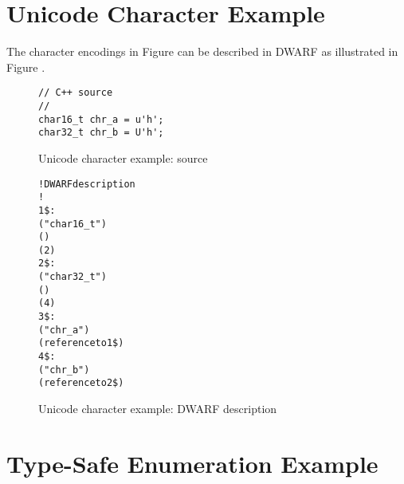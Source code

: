 \section{Unicode Character Example}
\label{app:unicodecharacterexample}
The  character encodings in
Figure 
can be described in DWARF as illustrated in 
Figure .

\begin{figure}[!h]
\begin{lstlisting}[numbers=none]
// C++ source
//
char16_t chr_a = u'h';
char32_t chr_b = U'h';
\end{lstlisting}
\caption{Unicode character example: source}
\label{fig:unicodecharacterexamplesource}
\end{figure}

\begin{figure}[h]
\begin{dwflisting}
\begin{alltt}

! DWARF description
!
1\$: 
        ("char16\_t")
        ()
        (2)
2\$: 
        ("char32\_t")
        ()
        (4)
3\$: 
        ("chr\_a")
        (reference to 1\$)
4\$: 
        ("chr\_b")
        (reference to 2\$)
\end{alltt}
\end{dwflisting}
\caption{Unicode character example: DWARF description}
\label{fig:unicodecharacterexampledwarfdescription}
\end{figure}


\section{Type-Safe Enumeration Example}
\label{app:typesafeenumerationexample}

